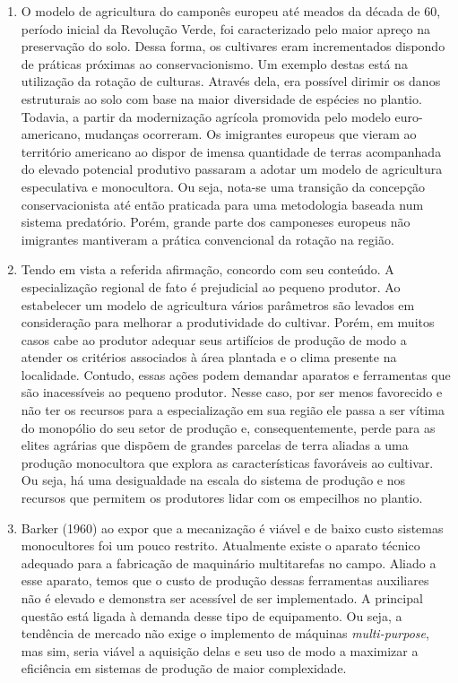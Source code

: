 \documentclass[a4paper, 12pt]{article}
\begin{document}
	\begin{enumerate}
		\item O modelo de agricultura do camponês europeu até meados da década de 60, período inicial da Revolução Verde, foi caracterizado pelo maior apreço na preservação do solo. Dessa forma, os cultivares eram incrementados dispondo de práticas próximas ao conservacionismo. Um exemplo destas está na utilização da rotação de culturas. Através dela, era possível dirimir os danos estruturais ao solo com base na maior diversidade de espécies no plantio. Todavia, a partir da modernização agrícola promovida pelo modelo euro-americano, mudanças ocorreram. Os imigrantes europeus que vieram ao território americano ao dispor de imensa quantidade de terras acompanhada do elevado potencial  produtivo passaram a adotar um modelo de agricultura especulativa e monocultora. Ou seja, nota-se uma transição da concepção conservacionista até então praticada para uma metodologia baseada num sistema predatório. Porém, grande parte dos camponeses europeus não imigrantes mantiveram a prática convencional da rotação na região.
		
		\item Tendo em vista a referida afirmação, concordo com seu conteúdo. A especialização regional de fato é prejudicial ao pequeno produtor. Ao estabelecer um modelo de agricultura vários parâmetros são levados em consideração para melhorar a produtividade do cultivar. Porém, em muitos casos cabe ao produtor adequar seus artifícios de produção de modo a atender os critérios associados à área plantada e o clima presente na localidade. Contudo, essas ações podem demandar aparatos e ferramentas que são inacessíveis ao pequeno produtor. Nesse caso, por ser menos favorecido e não ter os recursos para a especialização em sua região ele passa a ser vítima do monopólio do seu setor de produção e, consequentemente, perde para as elites agrárias que dispõem de grandes parcelas de terra aliadas a uma produção monocultora que explora as características favoráveis ao cultivar. Ou seja, há uma desigualdade na escala do sistema de produção e nos recursos que permitem os produtores lidar com os empecilhos no plantio.
		
		\item Barker (1960) ao expor que a mecanização é viável e de baixo custo sistemas monocultores foi um pouco restrito. Atualmente existe o aparato técnico adequado para a fabricação de maquinário multitarefas no campo. Aliado a esse aparato, temos que o custo de produção dessas ferramentas auxiliares não é elevado e demonstra ser acessível de ser implementado. A principal questão está ligada à demanda desse tipo de equipamento. Ou seja, a tendência de mercado não exige o implemento de máquinas \textit{multi-purpose}, mas sim, seria viável a aquisição delas e seu uso de modo a maximizar a eficiência em sistemas de produção de maior complexidade.
	\end{enumerate}
\end{document}
